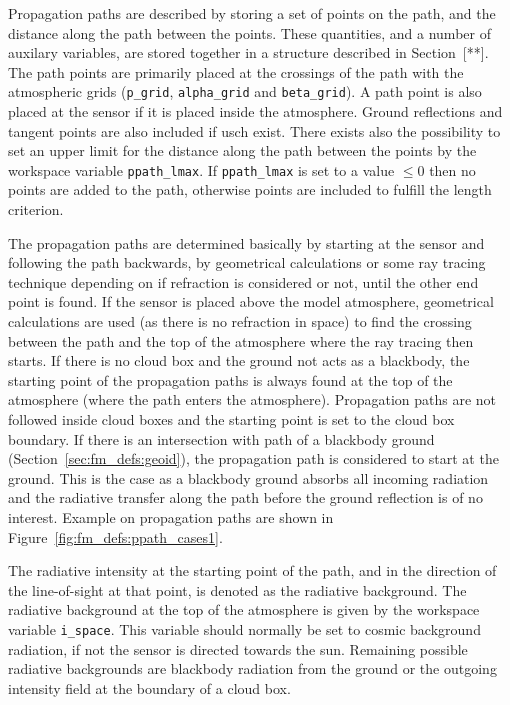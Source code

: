 Propagation paths are described by storing a set of points on the
path, and the distance along the path between the points. These
quantities, and a number of auxilary variables, are stored together in
a structure described in Section~[**]. The path points are primarily
placed at the crossings of the path with the atmospheric grids
(\verb|p_grid|, \verb|alpha_grid| and \verb|beta_grid|). A path point
is also placed at the sensor if it is placed inside the atmosphere.
Ground reflections and tangent points are also included if usch exist.
There exists also the possibility to set an upper limit for the
distance along the path between the points by the workspace variable
\verb|ppath_lmax|. If \verb|ppath_lmax| is set to a value $\leq 0$ then
no points are added to the path, otherwise points are included to
fulfill the length criterion. 

The propagation paths are determined basically by starting at the
sensor and following the path backwards, by geometrical calculations
or some ray tracing technique depending on if refraction is considered
or not, until the other end point is found. If the sensor is placed
above the model atmosphere, geometrical calculations are used (as
there is no refraction in space) to find the crossing between the path
and the top of the atmosphere where the ray tracing then starts.  If
there is no cloud box and the ground not acts as a blackbody, the
starting point of the propagation paths is always found at the top of
the atmosphere (where the path enters the atmosphere). Propagation
paths are not followed inside cloud boxes and the starting point is
set to the cloud box boundary. If there is an intersection with path
of a blackbody ground (Section~\ref{sec:fm_defs:geoid}), the
propagation path is considered to start at the ground. This is the
case as a blackbody ground absorbs all incoming radiation and the
radiative transfer along the path before the ground reflection is of
no interest. Example on propagation paths are shown in
Figure~\ref{fig:fm_defs:ppath_cases1}.

The radiative intensity at the starting point of the path, and in the
direction of the line-of-sight at that point, is denoted as the
radiative background. The radiative background at the top of the
atmosphere is given by the workspace variable \verb|i_space|. This
variable should normally be set to cosmic background radiation, if not
the sensor is directed towards the sun. Remaining possible radiative
backgrounds are blackbody radiation from the ground or the outgoing
intensity field at the boundary of a cloud box.

